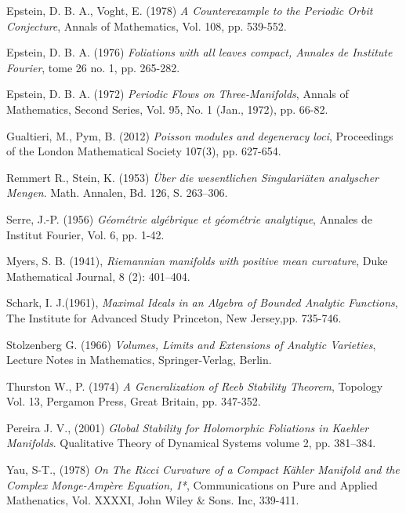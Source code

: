 \documentclass{article}
\begin{document}
\begin{thebibliography}{3}
 Epstein, D. B. A., Voght, E. (1978) \textit{A Counterexample to the Periodic Orbit Conjecture}, 
Annals of Mathematics, Vol. 108, pp. 539-552. 

 Epstein, D. B. A. (1976) \textit{Foliations with all leaves compact, Annales de Institute Fourier},
tome 26 no. 1, pp. 265-282.

 Epstein, D. B. A. (1972) \textit{Periodic Flows on Three-Manifolds}, Annals of Mathematics,
Second Series, Vol. 95, No. 1 (Jan., 1972), pp. 66-82.

 Gualtieri, M., Pym, B. (2012) \textit{Poisson modules and degeneracy loci},
Proceedings of the London Mathematical Society 107(3), pp. 627-654.

 Remmert R., Stein, K. (1953) \textit{Über die wesentlichen
Singulariäten analyscher Mengen}. Math. Annalen, Bd. 126, S. 263--306.

 Serre, J.-P. (1956) \textit{G\'eom\'etrie alg\'ebrique et
g\'eom\'etrie analytique}, Annales de Institut Fourier, Vol. 6, pp. 1-42. 

 Myers, S. B. (1941), \textit{Riemannian manifolds with positive mean curvature}, Duke Mathematical Journal, 
8 (2): 401–404.

 Schark, I. J.(1961), \textit{Maximal Ideals in an Algebra of Bounded Analytic Functions}, The Institute for Advanced Study
Princeton, New Jersey,pp. 735-746.

 Stolzenberg G. (1966) \textit{Volumes, Limits and
Extensions of Analytic Varieties}, Lecture Notes in Mathematics,
Springer-Verlag, Berlin. 

 Thurston W., P. (1974) \textit{A Generalization of Reeb Stability Theorem}, Topology Vol. 13,
Pergamon Press, Great Britain, pp. 347-352.

 Pereira J. V., (2001) \textit{Global Stability for Holomorphic Foliations in Kaehler Manifolds}.
Qualitative Theory of Dynamical Systems volume 2, pp. 381–384.

 Yau, S-T., (1978) \textit{On The Ricci Curvature of a Compact K\"ahler Manifold and the Complex Monge-Amp\`ere Equation, I*},
Communications on Pure and Applied Mathenatics, Vol. XXXXI, John Wiley \& Sons. Inc, 339-411.
\end{thebibliography}
\end{document}
